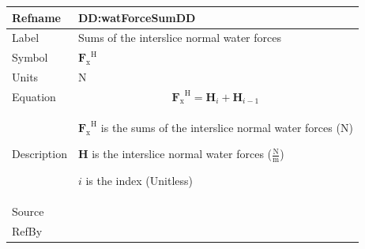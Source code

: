 \documentclass[12pt]{article}
\begin{document}
\medskip
\noindent
\begin{minipage}{\textwidth}
\begin{tabular}{>{\raggedright}p{}>{\raggedright\arraybackslash}p{}}
\toprule \textbf{Refname} & \textbf{DD:watForceSumDD}
\label{DD:watForceSumDD}
\\ \midrule
Label & Sums of the interslice normal water forces
        
\\ \midrule
Symbol & ${{\symbf{F}_{\text{x}}}^{\text{H}}}$
         
\\ \midrule
Units & ${\text{N}}$
        
\\ \midrule
Equation & \begin{displaymath}
           {{\symbf{F}_{\text{x}}}^{\text{H}}}={\symbf{H}}_{i}+{\symbf{H}}_{i-1}
           \end{displaymath}
\\ \midrule
Description & \begin{symbDescription}
              \item{${{\symbf{F}_{\text{x}}}^{\text{H}}}$ is the sums of the interslice normal water forces (${\text{N}}$)}
              \item{$\symbf{H}$ is the interslice normal water forces ($\frac{\text{N}}{\text{m}}$)}
              \item{$i$ is the index (Unitless)}
              \end{symbDescription}
\\ \midrule
Source & \cite{fredlund1977}
         
\\ \midrule
RefBy & 
\\ \bottomrule
\end{tabular}
\end{minipage}
\end{document}
